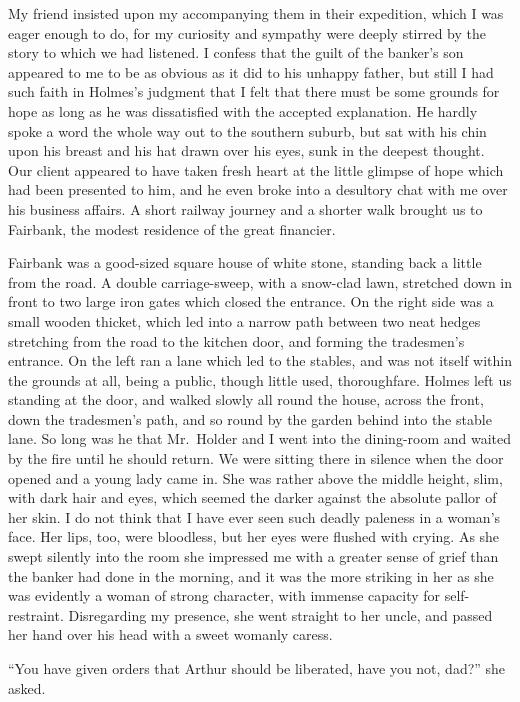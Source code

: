 My friend insisted upon my accompanying them in their
expedition, which I was eager enough to do, for my curiosity
and sympathy were deeply stirred by the story to which we
had listened. I confess that the guilt of the banker’s son
appeared to me to be as obvious as it did to his unhappy
father, but still I had such faith in Holmes’s judgment that I
felt that there must be some grounds for hope as long as he
was dissatisfied with the accepted explanation. He hardly
spoke a word the whole way out to the southern suburb, but
sat with his chin upon his breast and his hat drawn over his
eyes, sunk in the deepest thought. Our client appeared to
have taken fresh heart at the little glimpse of hope which had
been presented to him, and he even broke into a desultory
chat with me over his business affairs. A short railway journey
and a shorter walk brought us to Fairbank, the modest
residence of the great financier.

Fairbank was a good-sized square house of white stone,
standing back a little from the road. A double carriage-sweep,
with a snow-clad lawn, stretched down in front to two large
iron gates which closed the entrance. On the right side was
a small wooden thicket, which led into a narrow path between
two neat hedges stretching from the road to the kitchen door,
and forming the tradesmen’s entrance. On the left ran a lane
which led to the stables, and was not itself within the grounds
at all, being a public, though little used, thoroughfare. Holmes
left us standing at the door, and walked slowly all round the
house, across the front, down the tradesmen’s path, and so
round by the garden behind into the stable lane. So long was
he that Mr.~Holder and I went into the dining-room and
waited by the fire until he should return. We were sitting
there in silence when the door opened and a young lady came
in. She was rather above the middle height, slim, with dark
hair and eyes, which seemed the darker against the absolute
pallor of her skin. I do not think that I have ever seen such
deadly paleness in a woman’s face. Her lips, too, were bloodless,
but her eyes were flushed with crying. As she swept
silently into the room she impressed me with a greater sense
of grief than the banker had done in the morning, and it was
the more striking in her as she was evidently a woman of
strong character, with immense capacity for self-restraint.
Disregarding my presence, she went straight to her uncle, and
passed her hand over his head with a sweet womanly caress.

“You have given orders that Arthur should be liberated,
have you not, dad?” she asked.

